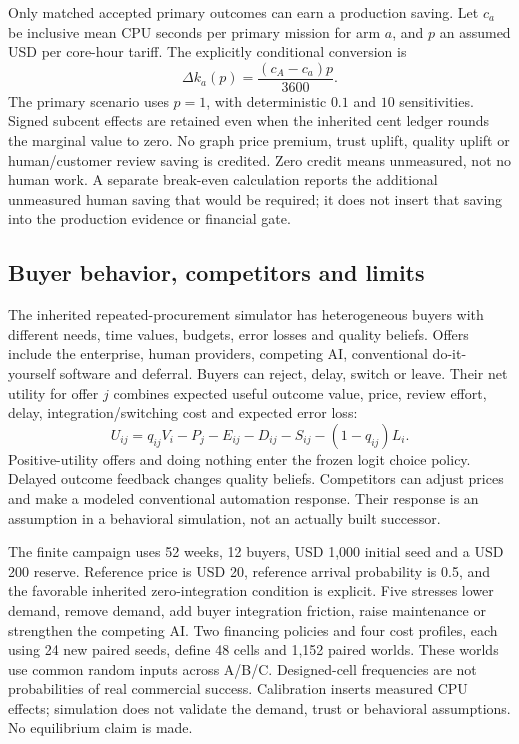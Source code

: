 \documentclass[11pt,a4paper]{article}
\begin{document}
Only matched accepted primary outcomes can earn a production saving. Let $c_a$ be inclusive mean CPU seconds per primary mission for arm $a$, and $p$ an assumed USD per core-hour tariff. The explicitly conditional conversion is
\begin{equation}
\Delta k_a(p)=\frac{(c_A-c_a)p}{3600}.
\end{equation}
The primary scenario uses $p=1$, with deterministic $0.1$ and $10$ sensitivities. Signed subcent effects are retained even when the inherited cent ledger rounds the marginal value to zero. No graph price premium, trust uplift, quality uplift or human/customer review saving is credited. Zero credit means unmeasured, not no human work. A separate break-even calculation reports the additional unmeasured human saving that would be required; it does not insert that saving into the production evidence or financial gate.

\subsection{Buyer behavior, competitors and limits}
The inherited repeated-procurement simulator has heterogeneous buyers with different needs, time values, budgets, error losses and quality beliefs. Offers include the enterprise, human providers, competing AI, conventional do-it-yourself software and deferral. Buyers can reject, delay, switch or leave. Their net utility for offer $j$ combines expected useful outcome value, price, review effort, delay, integration/switching cost and expected error loss:
\begin{equation}
U_{ij}=q_{ij}V_i-P_j-E_{ij}-D_{ij}-S_{ij}-(1-q_{ij})L_i.
\end{equation}
Positive-utility offers and doing nothing enter the frozen logit choice policy. Delayed outcome feedback changes quality beliefs. Competitors can adjust prices and make a modeled conventional automation response. Their response is an assumption in a behavioral simulation, not an actually built successor.

The finite campaign uses 52 weeks, 12 buyers, USD 1,000 initial seed and a USD 200 reserve. Reference price is USD 20, reference arrival probability is 0.5, and the favorable inherited zero-integration condition is explicit. Five stresses lower demand, remove demand, add buyer integration friction, raise maintenance or strengthen the competing AI. Two financing policies and four cost profiles, each using 24 new paired seeds, define 48 cells and 1,152 paired worlds. These worlds use common random inputs across A/B/C. Designed-cell frequencies are not probabilities of real commercial success. Calibration inserts measured CPU effects; simulation does not validate the demand, trust or behavioral assumptions. No equilibrium claim is made.
\end{document}
